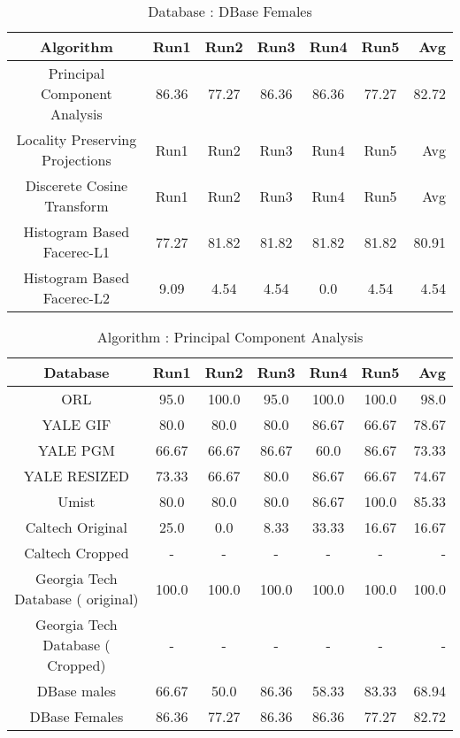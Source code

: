 \documentclass[10pt,a4paper]{article}
\begin{document}
\begin{center}
\begin{table}
\begin{tabular}{| c | c | c | c | c | c | r | }
\end{tabular}
\end{table}


\begin{table}
\caption{Database : DBase Females }
\centering
\begin{tabular}{| c | c | c | c | c | c | r | } \hline 
Algorithm & Run1 & Run2 & Run3 & Run4 & Run5 & Avg \\  
\hline
Principal Component Analysis & 86.36 & 77.27 & 86.36 & 86.36 & 77.27 & 82.72 \\
\hline
Locality Preserving Projections & Run1 & Run2 & Run3 & Run4 & Run5 & Avg \\
\hline
Discerete Cosine Transform & Run1 & Run2 & Run3 & Run4 & Run5 & Avg \\
\hline
Histogram Based Facerec-L1 & 77.27 & 81.82 & 81.82 & 81.82 & 81.82 & 80.91 \\
\hline
Histogram Based Facerec-L2 & 9.09 & 4.54 & 4.54 & 0.0 & 4.54 & 4.54 \\
\hline

\end{tabular}
\end{table}

\begin{table}
\caption{Algorithm : Principal Component Analysis }
\centering
\begin{tabular}{| c | c | c | c | c | c | r | } \hline 
Database & Run1 & Run2 & Run3 & Run4 & Run5 & Avg  \\  
\hline
ORL & 95.0 & 100.0 & 95.0 & 100.0 & 100.0 & 98.0 \\
\hline
YALE GIF & 80.0 & 80.0 & 80.0 & 86.67 & 66.67 & 78.67 \\
\hline
YALE PGM & 66.67 & 66.67 & 86.67 & 60.0 & 86.67 & 73.33 \\
\hline
YALE RESIZED & 73.33 & 66.67 & 80.0 & 86.67 & 66.67 & 74.67 \\
\hline
Umist & 80.0 & 80.0 & 80.0 & 86.67 & 100.0 & 85.33 \\
\hline
Caltech Original & 25.0 & 0.0 & 8.33 & 33.33 & 16.67 & 16.67 \\
\hline
Caltech Cropped & - & - & - & - & - & - \\
\hline
Georgia Tech Database ( original) & 100.0 & 100.0 & 100.0 & 100.0 & 100.0 & 100.0 \\
\hline
Georgia Tech Database ( Cropped) & - & - & - & - & - & - \\
\hline
DBase males & 66.67 & 50.0 & 86.36 & 58.33 & 83.33 & 68.94 \\
\hline
DBase Females  & 86.36 & 77.27 & 86.36 & 86.36 & 77.27 & 82.72 \\
\hline
\end{tabular}
\end{table}


\end{center}
\end{document}
